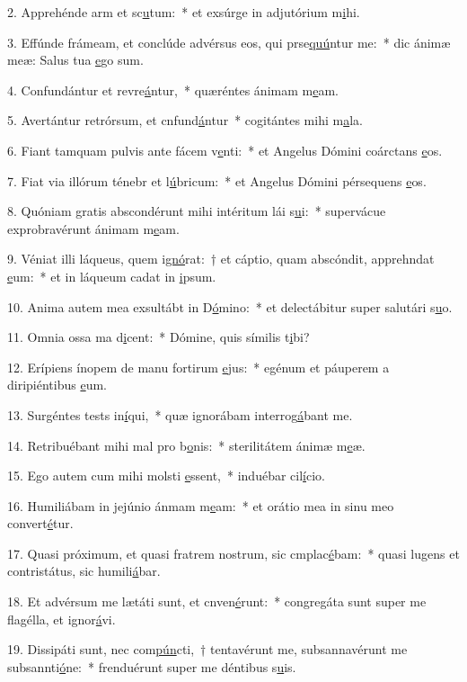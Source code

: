 2. Apprehénde arm et sc\uline{u}tum:~* et exsúrge in adjutórium m\uline{i}hi.\par 
3. Effúnde frámeam, et conclúde advérsus eos, qui prse\uline{quú}ntur me:~* dic ánimæ meæ: Salus tua \uline{e}go sum.\par 
4. Confundántur et revre\uline{á}ntur,~* quæréntes ánimam m\uline{e}am.\par 
5. Avertántur retrórsum, et cnfund\uline{á}ntur~* cogitántes mihi m\uline{a}la.\par 
6. Fiant tamquam pulvis ante fácem v\uline{e}nti:~* et Angelus Dómini coárctans \uline{e}os.\par 
7. Fiat via illórum ténebr et l\uline{ú}bricum:~* et Angelus Dómini pérsequens \uline{e}os.\par 
8. Quóniam gratis abscondérunt mihi intéritum lái s\uline{u}i:~* supervácue exprobravérunt ánimam m\uline{e}am.\par 
9. Véniat illi láqueus, quem i\uline{gnó}rat:~† et cáptio, quam abscóndit, apprehndat \uline{e}um:~* et in láqueum cadat in \uline{i}psum.\par 
10. Anima autem mea exsultábt in D\uline{ó}mino:~* et delectábitur super salutári s\uline{u}o.\par 
11. Omnia ossa ma d\uline{i}cent:~* Dómine, quis símilis t\uline{i}bi?\par 
12. Erípiens ínopem de manu fortirum \uline{e}jus:~* egénum et páuperem a diripiéntibus \uline{e}um.\par 
13. Surgéntes tests in\uline{í}qui,~* quæ ignorábam interrog\uline{á}bant me.\par 
14. Retribuébant mihi mal pro b\uline{o}nis:~* sterilitátem ánimæ m\uline{e}æ.\par 
15. Ego autem cum mihi molsti \uline{e}ssent,~* induébar cil\uline{í}cio.\par 
16. Humiliábam in jejúnio ánmam m\uline{e}am:~* et orátio mea in sinu meo convert\uline{é}tur.\par 
17. Quasi próximum, et quasi fratrem nostrum, sic cmplac\uline{é}bam:~* quasi lugens et contristátus, sic humili\uline{á}bar.\par 
18. Et advérsum me lætáti sunt, et cnven\uline{é}runt:~* congregáta sunt super me flagélla, et ignor\uline{á}vi.\par 
19. Dissipáti sunt, nec com\uline{pún}cti,~† tentavérunt me, subsannavérunt me subsannti\uline{ó}ne:~* frenduérunt super me déntibus s\uline{u}is.\par 
